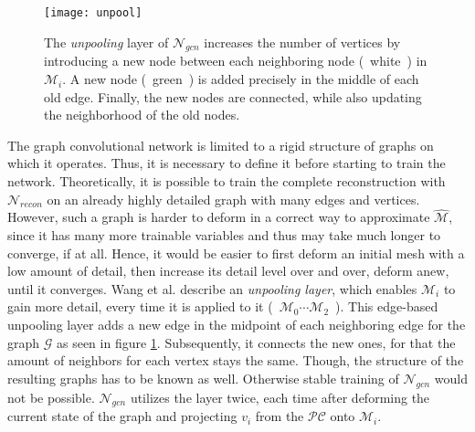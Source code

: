    \label{gcnconv}
   \begin{figure}
      \begin{center}
      \texttt{[image: unpool]}
      \caption{The \emph{unpooling} layer of $\mathcal{N}_{gcn}$ increases the
       number of vertices by introducing a new node between each neighboring node
        (~white~) in $\mathcal{M}_i$. A new node (~green~) is added precisely in 
        the middle of each old edge. Finally, the new nodes are connected, while also updating the neighborhood of the old nodes.}
      \label{fig:unpool}
      \end{center}
    \end{figure}

   The graph convolutional network is limited to a rigid structure of graphs on which it operates. 
   Thus, it is necessary to define it before starting to train the network. Theoretically, it is possible 
   to train the complete reconstruction with $\mathcal{N}_{recon}$ on an already highly detailed graph with 
   many edges and vertices. However, such a graph is harder to deform in a correct way to approximate $\hat{\mathcal{M}}$, 
   since it has many more trainable variables and thus may take much longer to converge, if at all. Hence, it would be easier to
   first deform an initial mesh with a low amount of detail, then increase its detail level over and over, deform anew, until it converges.
   Wang et al. \cite{wang2018pixel2mesh} describe an \emph{unpooling layer}, which enables $\mathcal{M}_i$ to gain more detail,
    every time it is applied to it (~$\mathcal{M}_0 \cdots \mathcal{M}_2$~). 
   This edge-based unpooling layer adds a new edge in the midpoint of each neighboring edge for the graph $\mathcal{G}$ as seen in 
   figure \ref{fig:unpool}. Subsequently, it connects the new ones, for that the amount of neighbors for each vertex stays the same. 
   Though, the structure of the resulting graphs has to be known as well. Otherwise stable training of $\mathcal{N}_{gcn}$ would not be possible. 
   $\mathcal{N}_{gcn}$ utilizes the layer twice, each time after deforming the current state of the graph and projecting $v_i$ 
   from the $\mathcal{PC}$ onto $\mathcal{M}_{i}$. 

